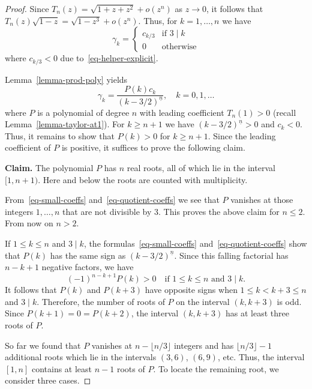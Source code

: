 \documentclass[12pt]{amsart}
\theoremstyle{definition}
\theoremstyle{remark}
\numberwithin{equation}{section}
\begin{document}
\begin{proof} Since $T_n(z) = \sqrt{1+z+z^2} + o(z^n)$ as $z\to 0$, it follows that 
$T_n(z) \sqrt{1-z} = \sqrt{1-z^3} + o(z^n)$. Thus, for $k=1,\dots, n$ we have 
\begin{equation}\label{eq-small-coeffs}
\gamma_k = \begin{cases}
c_{k/3} & \text{if $3\mid k$} \\ 
0 & \text{otherwise}
\end{cases}
\end{equation}
where $c_{k/3}<0$ due to~\eqref{eq-helper-explicit}. 

Lemma~\ref{lemma-prod-poly} yields  
\begin{equation}\label{eq-quotient-coeffs}
\gamma_k = \frac{P(k) c_k}{(k-3/2)^{\underline{n}}},\quad k=0,1,\dots
\end{equation}
where $P$ is a polynomial of degree $n$ with leading coefficient $T_n(1)>0$ (recall Lemma~\ref{lemma-taylor-at1}). For $k\ge n+1$ we have $(k-3/2)^{\underline{n}}>0$ and $c_k<0$. Thus, it remains to show that $P(k)>0$ for $k\ge n+1$. Since the leading coefficient of $P$ is positive, it suffices to prove the following claim. 

\textbf{Claim.} The polynomial $P$ has $n$ real roots, all of which lie in the interval $[1, n+1)$. Here and below the roots are counted with multiplicity.

From~\eqref{eq-small-coeffs} and~\eqref{eq-quotient-coeffs} we see that $P$ vanishes at those integers $1,\dots, n$ that are not divisible by $3$. This proves the above claim for $n\le 2$. From now on $n>2$. 

If $1\le k\le n$ and $3\mid k$, the formulas~\eqref{eq-small-coeffs} and~\eqref{eq-quotient-coeffs} show that $P(k)$ has the same sign as $(k-3/2)^{\underline{n}}$. Since this falling factorial has $n-k+1$ negative factors, we have
\begin{equation}\label{eq-sign-k3}
(-1)^{n-k+1} P(k) > 0 \quad \text{if } 1\le k\le n \text{ and } 3\mid k.   
\end{equation}
It follows that $P(k)$ and $P(k+3)$  have opposite signs when $1\le k < k+3\le n$ and $3\mid k$. Therefore, the number of roots of $P$ on the interval $(k, k+3)$ is odd. Since $P(k+1)=0=P(k+2)$, the interval $(k, k+3)$ has at least three roots of $P$. 

So far we found that $P$ vanishes at $n - \lfloor n/3\rfloor$ integers and has $\lfloor n/3\rfloor - 1$ additional roots which lie in the intervals $(3, 6)$, $(6, 9)$, etc. Thus, the interval $[1, n]$ contains at least $n-1$ roots of $P$. To locate the remaining root, we consider three cases.


\end{proof}
\end{document}
